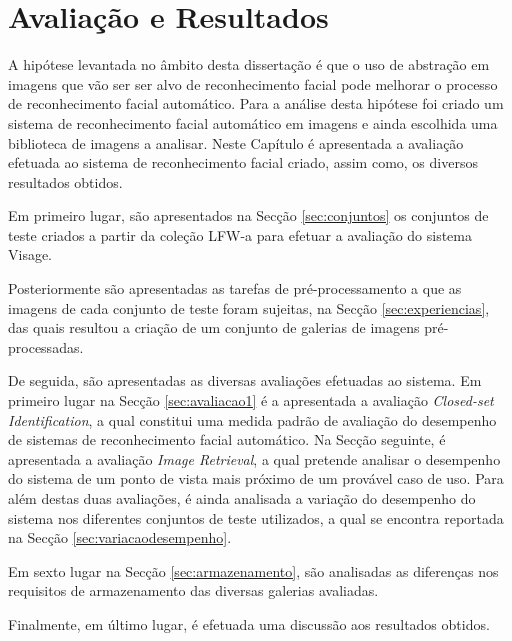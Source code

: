 \chapter{Avaliação e Resultados} \label{chap:resultados}

A hipótese levantada no âmbito desta dissertação é que o uso de abstração em imagens que vão ser ser alvo de reconhecimento facial pode melhorar o processo de reconhecimento facial automático. Para a análise desta hipótese foi criado um sistema de reconhecimento facial automático em imagens e ainda escolhida uma biblioteca de imagens a analisar. Neste Capítulo é apresentada a avaliação efetuada ao sistema de reconhecimento facial criado, assim como, os diversos resultados obtidos. 

Em primeiro lugar, são apresentados  na Secção \ref{sec:conjuntos} os conjuntos de teste criados a partir da coleção LFW-a para efetuar a avaliação do sistema Visage.

Posteriormente são apresentadas as tarefas de pré-processamento a que as imagens de cada conjunto de teste foram sujeitas, na Secção \ref{sec:experiencias}, das quais resultou a criação de um conjunto de galerias de imagens pré-processadas. 

De seguida, são apresentadas as diversas avaliações efetuadas ao sistema. Em primeiro lugar na Secção \ref{sec:avaliacao1} é a apresentada a avaliação \textit{Closed-set Identification}, a qual constitui uma medida padrão de avaliação do desempenho de sistemas de reconhecimento facial automático. Na Secção seguinte, é apresentada a avaliação \textit{Image Retrieval}, a qual pretende analisar o desempenho do sistema de um ponto de vista mais próximo de um provável caso de uso. Para além destas duas avaliações, é ainda analisada a variação do desempenho do sistema nos diferentes conjuntos de teste utilizados, a qual se encontra reportada na Secção \ref{sec:variacaodesempenho}.

Em sexto lugar na Secção \ref{sec:armazenamento}, são analisadas as diferenças nos requisitos de armazenamento das diversas galerias avaliadas. 

Finalmente, em último lugar, é efetuada uma discussão aos resultados obtidos.

